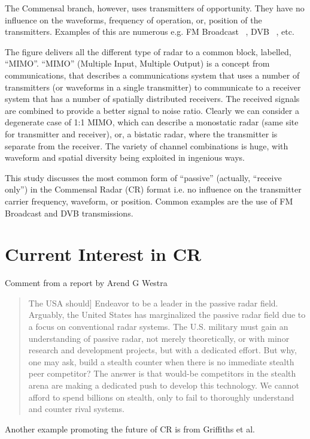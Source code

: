 \documentclass[english, 12pt]{report}
\begin{document}
The Commensal branch, however, uses transmitters of opportunity. They have no influence on the waveforms, frequency of operation, or, position of the transmitters. Examples of this are numerous e.g. FM Broadcast ~\cite{ohagan1}, DVB ~\cite{kuschel4}, etc.

The figure delivers all the different type of radar to a common block, labelled, ``MIMO''. ``MIMO'' (Multiple Input, Multiple Output) is a concept from communications, that describes a communications system that uses a number of transmitters (or waveforms in a single transmitter) to communicate to a receiver system that has a number of spatially distributed receivers. The received signals are combined to provide a better signal to noise ratio. Clearly we can consider a degenerate case of 1:1 MIMO, which can describe a monostatic radar (same site for transmitter and receiver), or, a bistatic radar, where the transmitter is separate from the receiver. The variety of channel combinations is huge, with waveform and spatial diversity being exploited in ingenious ways.

This study discusses the most common form of ``passive'' (actually, ``receive only'') in the Commensal Radar (CR) format i.e. no influence on the transmitter carrier frequency, waveform, or position. Common examples are the use of FM Broadcast and DVB transmissions.

\section{Current Interest in CR}

Comment from a report by Arend G Westra~\cite{westra:09} 

\begin{quote}The USA should] Endeavor to be a leader in the passive
radar field. Arguably, the United States has
marginalized the passive radar field due to
a focus on conventional radar systems. The
U.S. military must gain an understanding
of passive radar, not merely theoretically, or
with minor research and development projects,
but with a dedicated effort. But why, one
may ask, build a stealth counter when there
is no immediate stealth peer competitor? The
answer is that would-be competitors in the
stealth arena are making a dedicated push to
develop this technology. We cannot afford to
spend billions on stealth, only to fail to thoroughly
understand and counter rival systems.
\end{quote}

Another example promoting the future of CR is from Griffiths et al.~\cite{griffiths1}
\end{document}
